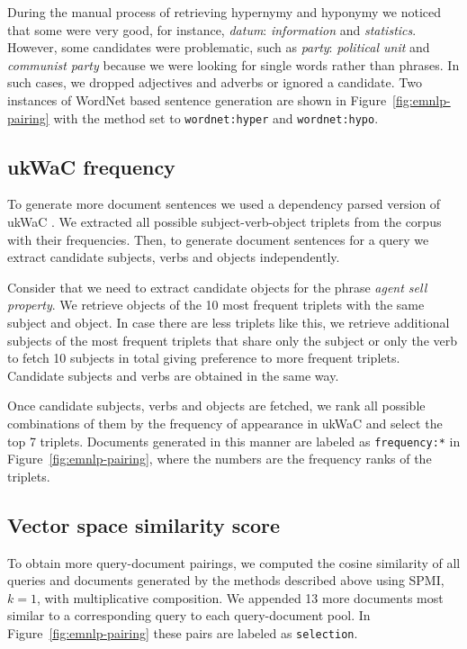 During the manual process of retrieving hypernymy and hyponymy we noticed that some were very good, for instance, \textit{datum}: \textit{information} and \textit{statistics}. However, some candidates were problematic, such as \textit{party}: \textit{political unit} and \textit{communist party} because we were looking for single words rather than phrases. In such cases, we dropped adjectives and adverbs or ignored a candidate. Two instances of WordNet based sentence generation are shown in Figure~\ref{fig:emnlp-pairing} with the method set to \texttt{wordnet:hyper} and \texttt{wordnet:hypo}.

\subsection{ukWaC frequency}

To generate more document sentences we used a dependency parsed version of ukWaC \cite{ukwac}. We extracted all possible subject-verb-object triplets from the corpus with their frequencies. Then, to generate document sentences for a query we extract candidate subjects, verbs and objects independently.

Consider that we need to extract candidate objects for the phrase \textit{agent sell property}. We retrieve objects of the 10 most frequent triplets with the same subject and object. In case there are less triplets like this, we retrieve additional subjects of the most frequent triplets that share only the subject or only the verb to fetch 10 subjects in total giving preference to more frequent triplets. Candidate subjects and verbs are obtained in the same way.

Once candidate subjects, verbs and objects are fetched, we rank all possible combinations of them by the frequency of appearance in ukWaC and select the top 7 triplets. Documents generated in this manner are labeled as \texttt{frequency:*} in Figure~\ref{fig:emnlp-pairing}, where the numbers are the frequency ranks of the triplets.

\subsection{Vector space similarity score}

To obtain more query-document pairings, we computed the cosine similarity of all queries and documents generated by the methods described above using SPMI, $k=1$, with multiplicative composition. We appended 13 more documents most similar to a corresponding query to each query-document pool. In Figure~\ref{fig:emnlp-pairing} these pairs are labeled as \texttt{selection}.

